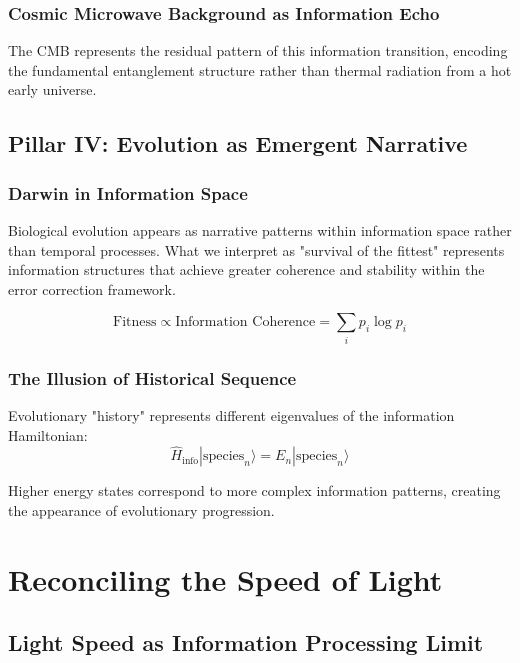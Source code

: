 \documentclass[12pt]{article}
\begin{document}
\subsubsection{Cosmic Microwave Background as Information Echo}

The CMB represents the residual pattern of this information transition, encoding the fundamental entanglement structure rather than thermal radiation from a hot early universe.

\subsection{Pillar IV: Evolution as Emergent Narrative}

\subsubsection{Darwin in Information Space}

Biological evolution appears as narrative patterns within information space rather than temporal processes. What we interpret as "survival of the fittest" represents information structures that achieve greater coherence and stability within the error correction framework.

\begin{equation}
\text{Fitness} \propto \text{Information Coherence} = \sum_i p_i \log p_i
\end{equation}

\subsubsection{The Illusion of Historical Sequence}

Evolutionary "history" represents different eigenvalues of the information Hamiltonian:
\begin{equation}
\hat{H}_{\text{info}} |\text{species}_n\rangle = E_n |\text{species}_n\rangle
\end{equation}

Higher energy states correspond to more complex information patterns, creating the appearance of evolutionary progression.

\section{Reconciling the Speed of Light}

\subsection{Light Speed as Information Processing Limit}
\end{document}
